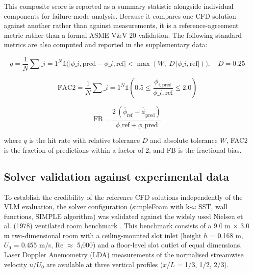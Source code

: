 \documentclass[preprint,12pt,number]{elsarticle}
\begin{document}
This composite score is reported as a summary statistic alongside individual components for failure-mode analysis. Because it compares one CFD solution against another rather than against measurements, it is a reference-agreement metric rather than a formal ASME V\&V 20 validation. The following standard metrics \cite{franke.etal2011COST732} are also computed and reported in the supplementary data:

\begin{equation}
q = \frac{1}{N}\sum\_{i=1}^{N} \mathbb{1}\!\bigl(|\phi\_{i,\text{pred}} - \phi\_{i,\text{ref}}| < \max(W,\; D\,|\phi\_{i,\text{ref}}|)\bigr), \quad D = 0.25
\label{eq:hit-rate}
\end{equation}

\begin{equation}
\text{FAC2} = \frac{1}{N}\sum\_{i=1}^{N} \mathbb{1}\!\left(0.5 \leq \frac{\phi_{i,\text{pred}}}{\phi\_{i,\text{ref}}} \leq 2.0\right)
\label{eq:fac2}
\end{equation}

\begin{equation}
\text{FB} = \frac{2\,(\bar{\phi}_\text{ref} - \bar{\phi}_\text{pred})}{\bar{\phi}\_\text{ref} + \bar{\phi}\_\text{pred}}
\label{eq:fractional-bias}
\end{equation}

where $q$ is the hit rate with relative tolerance $D$ and absolute tolerance $W$, FAC2 is the fraction of predictions within a factor of 2, and FB is the fractional bias.

\subsection{Solver validation against experimental data}
\label{sec:solver-validation-against-experimental-data}


To establish the credibility of the reference CFD solutions independently of the VLM evaluation, the solver configuration (simpleFoam with k-$\omega$ SST, wall functions, SIMPLE algorithm) was validated against the widely used Nielsen et al. (1978) ventilated room benchmark \cite{nielsen.etal1978VelocityCharacteristics}. This benchmark consists of a 9.0 m $\times$ 3.0 m two-dimensional room with a ceiling-mounted slot inlet (height $h$ = 0.168 m, $U_0$ = 0.455 m/s, Re $\approx$ 5,000) and a floor-level slot outlet of equal dimensions. Laser Doppler Anemometry (LDA) measurements of the normalised streamwise velocity $u/U_0$ are available at three vertical profiles ($x/L$ = 1/3, 1/2, 2/3).
\end{document}
